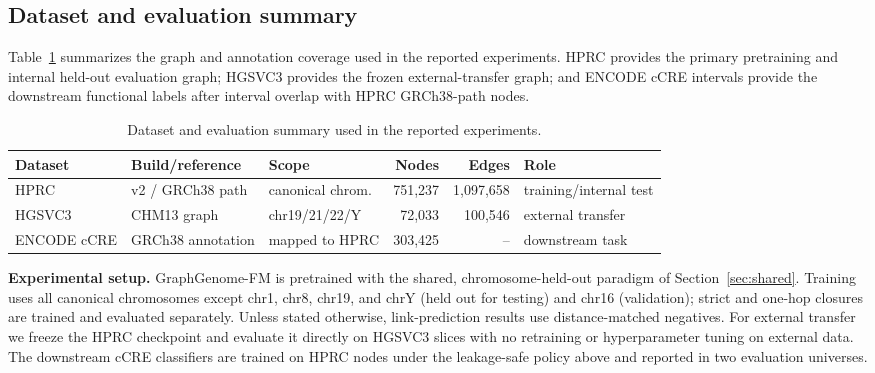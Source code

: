 \IfFileExists{ws-procs11x85.cls}{\worldscientificclasstrue\documentclass{ws-procs11x85}}{\worldscientificclassfalse\documentclass[11pt]{article}\usepackage[margin=1in]{geometry}}
\providecommand{\tbl}[2]{\caption{#1}#2}
\providecommand{\toprule}{\hline}
\providecommand{\colrule}{\hline}
\providecommand{\botrule}{\hline}
\begin{document}
\iffalse


\subsection{Dataset and evaluation summary}

Table~\ref{tab:results_dataset_summary} summarizes the graph and annotation
coverage used in the reported experiments. HPRC provides the primary
pretraining and internal held-out evaluation graph; HGSVC3 provides the frozen
external-transfer graph; and ENCODE cCRE intervals provide the downstream
functional labels after interval overlap with HPRC GRCh38-path nodes.

\begin{table}[t]
\tbl{Dataset and evaluation summary used in the reported experiments.}
{\small
\begin{tabular}{@{}lllrrl@{}}
\toprule
Dataset & Build/reference & Scope & Nodes & Edges & Role\\
\colrule
HPRC & v2 / GRCh38 path & canonical chrom. & 751{,}237 & 1{,}097{,}658 & training/internal test\\
HGSVC3 & CHM13 graph & chr19/21/22/Y & 72{,}033 & 100{,}546 & external transfer\\
ENCODE cCRE & GRCh38 annotation & mapped to HPRC & 303{,}425 & -- & downstream task\\
\botrule
\end{tabular}}
\label{tab:results_dataset_summary}
\end{table}

\textbf{Experimental setup.} GraphGenome-FM is pretrained with the shared,
chromosome-held-out paradigm of Section~\ref{sec:shared}. Training uses all
canonical chromosomes except chr1, chr8, chr19, and chrY (held out for testing)
and chr16 (validation); strict and one-hop closures are trained and evaluated
separately. Unless stated otherwise, link-prediction results use
distance-matched negatives. For external transfer we freeze the HPRC checkpoint
and evaluate it directly on HGSVC3 slices with no retraining or hyperparameter
tuning on external data. The downstream cCRE classifiers are trained on HPRC
nodes under the leakage-safe policy above and reported in two evaluation
universes.
\end{document}
